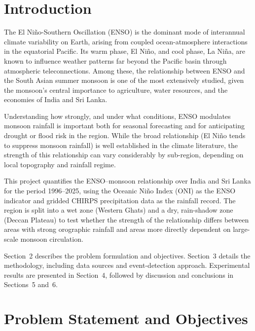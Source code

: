 \documentclass{article}
\begin{document}
\section{Introduction}

The El Ni\~{n}o-Southern Oscillation (ENSO) is the dominant mode of interannual climate
variability on Earth, arising from coupled ocean-atmosphere interactions in the
equatorial Pacific. Its warm phase, El Ni\~{n}o, and cool phase, La Ni\~{n}a, are known
to influence weather patterns far beyond the Pacific basin through atmospheric
teleconnections. Among these, the relationship between ENSO and the South Asian summer
monsoon is one of the most extensively studied, given the monsoon's central importance
to agriculture, water resources, and the economies of India and Sri Lanka.

Understanding how strongly, and under what conditions, ENSO modulates monsoon rainfall
is important both for seasonal forecasting and for anticipating drought or flood risk
in the region. While the broad relationship (El Ni\~{n}o tends to suppress monsoon
rainfall) is well established in the climate literature, the strength of this
relationship can vary considerably by sub-region, depending on local topography and
rainfall regime.

This project quantifies the ENSO--monsoon relationship over India and Sri Lanka for the
period 1996--2025, using the Oceanic Ni\~{n}o Index (ONI) as the ENSO indicator and
gridded CHIRPS precipitation data as the rainfall record. The region is split into a
wet zone (Western Ghats) and a dry, rain-shadow zone (Deccan Plateau) to test whether
the strength of the relationship differs between areas with strong orographic rainfall
and areas more directly dependent on large-scale monsoon circulation.

Section~2 describes the problem formulation and objectives. Section~3 details the
methodology, including data sources and event-detection approach. Experimental results
are presented in Section~4, followed by discussion and conclusions in Sections~5
and~6.

\section{Problem Statement and Objectives}
\end{document}
